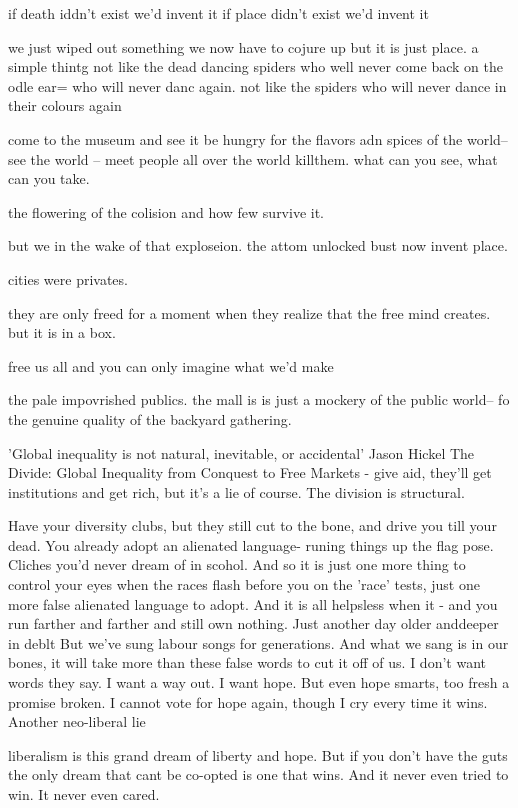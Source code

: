 if death iddn't exist we'd invent it
if place didn't exist we'd invent it

we just wiped out something we now have to cojure up but it is just place. a simple thintg not like the dead dancing spiders who well never come back on the odle ear= who will never danc again.
not like the spiders who will never dance in their colours again

come to the museum and see it
be hungry for the flavors adn spices of the world-- see the world -- meet people all over the world killthem.
what can you see, what can you take.

the flowering of the colision
and how few survive it.

but we in the wake of that exploseion. the attom unlocked bust now invent place.

cities were privates.

they are only freed for a moment when they realize that the free mind creates. but it is in a box.

free us all and you can only imagine what we'd make

the pale impovrished publics. the mall is is just a mockery of the public world-- fo the genuine quality of the backyard gathering. 

'Global inequality is not natural, inevitable, or accidental' Jason Hickel The Divide: Global Inequality from Conquest to Free Markets - give aid, they'll get institutions and get rich, but it's a lie of course.
The division is structural.

Have your diversity clubs, but they still cut to the bone, and drive you till your dead. You already adopt an alienated language- runing things up the flag pose. Cliches you'd never dream of in scohol. And so it is just one more thing to control your eyes when the races flash before you on the 'race' tests, just one more false alienated language to adopt. 
And it is all helpsless when it -
and you run farther and farther and still own nothing. Just another day older anddeeper in deblt
But we've sung labour songs for generations. And what we sang is in our bones, it will take more than these false words to cut it off of us. 
I don't want words they say.
I want a way out. I want hope. But even hope smarts, too fresh a promise broken. I cannot vote for hope again, though I cry every time it wins. Another neo-liberal lie

liberalism is this grand dream of liberty and hope. 
But if you don't have the guts
the only dream that cant be co-opted is one that wins.
And it never even tried to win. It never even cared. 


